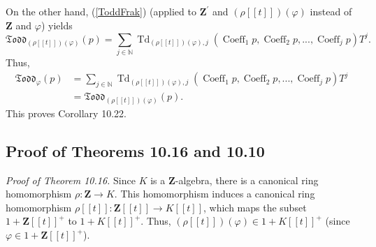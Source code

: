 \documentclass[numbers=enddot,12pt,final,onecolumn,notitlepage]{scrartcl}%
\begin{document}
On the other hand, (\ref{ToddFrak}) (applied to $\mathbf{Z}^{\prime}$ and
$\left(  \rho\left[  \left[  t\right]  \right]  \right)  \left(
\varphi\right)  $ instead of $\mathbf{Z}$ and $\varphi$) yields
\[
\mathfrak{Todd}_{\left(  \rho\left[  \left[  t\right]  \right]  \right)
\left(  \varphi\right)  }\left(  p\right)  =\sum\limits_{j\in\mathbb{N}%
}\operatorname*{Td}\nolimits_{\left(  \rho\left[  \left[  t\right]  \right]
\right)  \left(  \varphi\right)  ,j}\left(  \operatorname*{Coeff}%
\nolimits_{1}p,\operatorname*{Coeff}\nolimits_{2}p,...,\operatorname*{Coeff}%
\nolimits_{j}p\right)  T^{j}.
\]
Thus,%
\begin{align*}
\mathfrak{Todd}_{\varphi}\left(  p\right)   &  =\sum\limits_{j\in\mathbb{N}%
}\operatorname*{Td}\nolimits_{\left(  \rho\left[  \left[  t\right]  \right]
\right)  \left(  \varphi\right)  ,j}\left(  \operatorname*{Coeff}%
\nolimits_{1}p,\operatorname*{Coeff}\nolimits_{2}p,...,\operatorname*{Coeff}%
\nolimits_{j}p\right)  T^{j}\\
&  =\mathfrak{Todd}_{\left(  \rho\left[  \left[  t\right]  \right]  \right)
\left(  \varphi\right)  }\left(  p\right)  .
\end{align*}
This proves Corollary 10.22.

\subsection{Proof of Theorems 10.16 and 10.10}

\textit{Proof of Theorem 10.16.} Since $K$ is a $\mathbf{Z}$-algebra, there is
a canonical ring homomorphism $\rho:\mathbf{Z}\rightarrow K$. This
homomorphism induces a canonical ring homomorphism $\rho\left[  \left[
t\right]  \right]  :\mathbf{Z}\left[  \left[  t\right]  \right]  \rightarrow
K\left[  \left[  t\right]  \right]  $, which maps the subset $1+\mathbf{Z}%
\left[  \left[  t\right]  \right]  ^{+}$ to $1+K\left[  \left[  t\right]
\right]  ^{+}$. Thus, $\left(  \rho\left[  \left[  t\right]  \right]  \right)
\left(  \varphi\right)  \in1+K\left[  \left[  t\right]  \right]  ^{+}$ (since
$\varphi\in1+\mathbf{Z}\left[  \left[  t\right]  \right]  ^{+}$).
\end{document}
